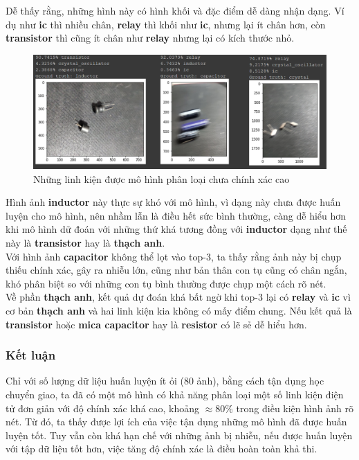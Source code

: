 \documentclass[a4paper]{article}
\begin{document}
\noindent
Dễ thấy rằng, những hình này có hình khối và đặc điểm dễ dàng nhận dạng. Ví dụ như \textbf{ic} thì nhiều chân, \textbf{relay} thì khối như \textbf{ic}, nhưng lại ít chân hơn, còn \textbf{transistor} thì cũng ít chân như \textbf{relay} nhưng lại có kích thước nhỏ.
\newpage
\begin{figure}[h!]
\centering
\includegraphics[width=15cm]{images/result2.PNG}
\caption{Những linh kiện được mô hình phân loại chưa chính xác cao}
\end{figure}

\noindent
Hình ảnh \textbf{inductor} này thực sự khó với mô hình, vì dạng này chưa được huấn luyện cho mô hình, nên nhầm lẫn là điều hết sức bình thường, càng dễ hiểu hơn khi mô hình dữ đoán với những thứ khá tương đồng với \textbf{inductor} dạng như thế này là \textbf{transistor} hay là \textbf{thạch anh}.\\
Với hình ảnh \textbf{capacitor} không thể lọt vào top-3, ta thấy rằng ảnh này bị chụp thiếu chính xác, gây ra nhiễu lớn, cũng như bản thân con tụ cũng có chân ngắn, khó phân biệt so với những con tụ bình thường được chụp một cách rõ nét.\\
Về phần \textbf{thạch anh}, kết quả dự đoán khá bất ngờ khi top-3 lại có \textbf{relay} và \textbf{ic} vì cơ bản \textbf{thạch anh} và hai linh kiện kia không có mấy điểm chung. Nếu kết quả là \textbf{transistor} hoặc \textbf{mica capacitor} hay là \textbf{resistor} có lẽ sẻ dễ hiểu hơn.

\subsubsection{Kết luận}
Chỉ với số lượng dữ liệu huấn luyện ít ỏi ($80$ ảnh), bằng cách tận dụng học chuyển giao, ta đã có một mô hình có khả năng phân loại một số linh kiện điện tử đơn giản với độ chính xác khá cao, khoảng $\approx 80\%$ trong điều kiện hình ảnh rõ nét. Từ đó, ta thấy được lợi ích của việc tận dụng những mô hình đã được huấn luyện tốt. Tuy vẫn còn khá hạn chế với những ảnh bị nhiễu, nếu được huấn luyện với tập dữ liệu tốt hơn, việc tăng độ chính xác là điều hoàn toàn khả thi.
\end{document}

